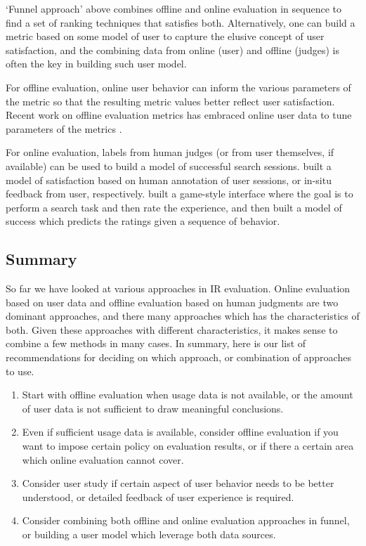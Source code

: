`Funnel approach' above combines offline and online evaluation in sequence to find a set of ranking techniques that satisfies both. Alternatively, one can build a metric based on some model of user to capture the elusive concept of user satisfaction, and the combining data from online (user) and offline (judges) is often the key in building such user model.

For offline evaluation, online user behavior can inform the various parameters of the metric so that the resulting metric values better reflect user satisfaction. Recent work on offline evaluation metrics has embraced online user data to tune parameters of the metrics \citep[for example]{CarteretteKY11, Carterette:2012,smucker12stochastic,YilmazSCR10}.

For online evaluation, labels from human judges (or from user themselves, if available) can be used to build a model of successful search sessions. \citep{Hassan:2010,Hassan:2012} built a model of satisfaction based on human annotation of user sessions, or in-situ feedback from user, respectively. \cite{Ageev:2011} built a game-style interface where the goal is to perform a search task and then rate the experience, and then built a model of success which predicts the ratings given a sequence of behavior.


\subsection{Summary}
So far we have looked at various approaches in IR evaluation. Online evaluation based on user data and offline evaluation based on human judgments are two dominant approaches, and there many approaches which has the characteristics of both. Given these approaches with different characteristics, it makes sense to combine a few methods in many cases. In summary, here is our list of recommendations for deciding on which approach, or combination of approaches to use.

\begin{enumerate}
	\item Start with offline evaluation when usage data is not available, or the amount of user data is not sufficient to draw meaningful conclusions.
	\item Even if sufficient usage data is available, consider offline evaluation if you want to impose certain policy on evaluation results, or if there a certain area which online evaluation cannot cover.
	\item Consider user study if certain aspect of user behavior needs to be better understood, or detailed feedback of user experience is required.
	\item Consider combining both offline and online evaluation approaches in funnel, or building a user model which leverage both data sources.
\end{enumerate}

